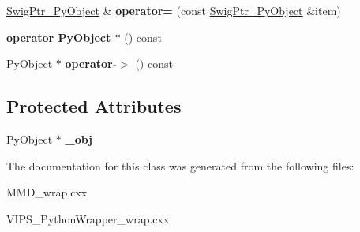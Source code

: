 \begin{DoxyCompactItemize}
\item 
\hyperlink{classswig_1_1SwigPtr__PyObject}{Swig\+Ptr\+\_\+\+Py\+Object} \& {\bfseries operator=} (const \hyperlink{classswig_1_1SwigPtr__PyObject}{Swig\+Ptr\+\_\+\+Py\+Object} \&item)\hypertarget{classswig_1_1SwigPtr__PyObject_a86d8657d6b4a27c8e9e6942bc1ba572c}{}\label{classswig_1_1SwigPtr__PyObject_a86d8657d6b4a27c8e9e6942bc1ba572c}

\item 
{\bfseries operator Py\+Object $\ast$} () const \hypertarget{classswig_1_1SwigPtr__PyObject_aa2f1cdba0651c7a52482d225faef0574}{}\label{classswig_1_1SwigPtr__PyObject_aa2f1cdba0651c7a52482d225faef0574}

\item 
Py\+Object $\ast$ {\bfseries operator-\/$>$} () const \hypertarget{classswig_1_1SwigPtr__PyObject_a97a20cad6a2b0916f39c45555fb559f0}{}\label{classswig_1_1SwigPtr__PyObject_a97a20cad6a2b0916f39c45555fb559f0}

\end{DoxyCompactItemize}
\subsection*{Protected Attributes}
\begin{DoxyCompactItemize}
\item 
Py\+Object $\ast$ {\bfseries \+\_\+obj}\hypertarget{classswig_1_1SwigPtr__PyObject_abb14c2948572bd4bf429540f7770831e}{}\label{classswig_1_1SwigPtr__PyObject_abb14c2948572bd4bf429540f7770831e}

\end{DoxyCompactItemize}


The documentation for this class was generated from the following files\+:\begin{DoxyCompactItemize}
\item 
M\+M\+D\+\_\+wrap.\+cxx\item 
V\+I\+P\+S\+\_\+\+Python\+Wrapper\+\_\+wrap.\+cxx\end{DoxyCompactItemize}
